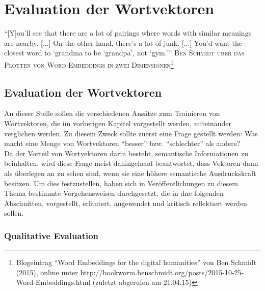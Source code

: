 
\chapter{Evaluation der Wortvektoren} %

\label{Chapter5} %


\begin{itquote}
``[Y]ou’ll see that there are a lot of pairings where words with similar meanings are nearby. [...]
On the other hand, there’s a lot of junk. [...] You’d want the closest word to `grandma to be `grandpa', not `gym.'''
\flushright
\textsc{Ben Schmidt über das Plotten von Word Embeddings in zwei Dimensionen\footnote{Blogeintrag ``Word Embeddings for the digital humanities'' von Ben Schmidt (2015),
online unter http://bookworm.benschmidt.org/posts/2015-10-25-Word-Embeddings.html (zuletzt abgerufen am 21.04.15)}}
\end{itquote}


\section{Evaluation der Wortvektoren}

An dieser Stelle sollen die verschiedenen Ansätze zum Trainieren von Wortvektoren, die im vorherigen Kapitel
vorgestellt werden, miteinander verglichen werden. Zu diesem Zweck sollte zuerst eine Frage gestellt werden:
Was macht eine Menge von Wortvektoren ``besser'' bzw. ``schlechter'' als andere?\\
Da der Vorteil von Wortvektoren darin besteht, semantische Informationen zu beinhalten, wird diese
Frage meist dahingehend beantwortet, dass Vektoren dann als überlegen an zu sehen sind, wenn sie
eine höhere semantische Ausdruckskraft besitzen. Um dies festzustellen, haben sich in Veröffentlichungen
zu diesem Thema bestimmte Vorgehensweisen durchgesetzt, die in dne folgenden Abschnitten, vorgestellt, erläutert,
angewendet und kritisch reflektiert werden sollen.\\

  \subsection{Qualitative Evaluation}

